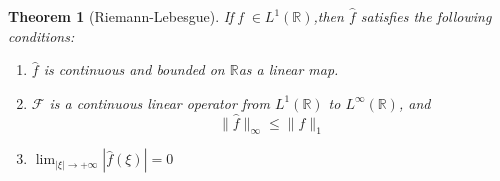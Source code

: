 \documentclass[12pt, oneside, a4paper]{article}
\newtheorem{thm}{Theorem}[section]
\theoremstyle{dfn}
\def\Rbb{\ensuremath{\mathbb{R}}}
\begin{document}
\begin{thm}[Riemann-Lebesgue]
 If f $\in L^{1}(\Rbb)$,then $\widehat{f}$ satisfies the following conditions:
\begin{enumerate}
 \item $\widehat{f}$ is continuous and bounded on \Rbb as a linear map. 
\item $\mathcal{F}$ is a continuous linear operator from $L^1(\Rbb)$ to $L^\infty(\Rbb)$, and
\begin{equation}
 \|\widehat{f}\|_\infty \leq \|f\|_{1}
\end{equation}
\item $\lim_{|\xi| \rightarrow + \infty} |\widehat{f}(\xi)| = 0$
\end{enumerate}

\end{thm}
\end{document}
